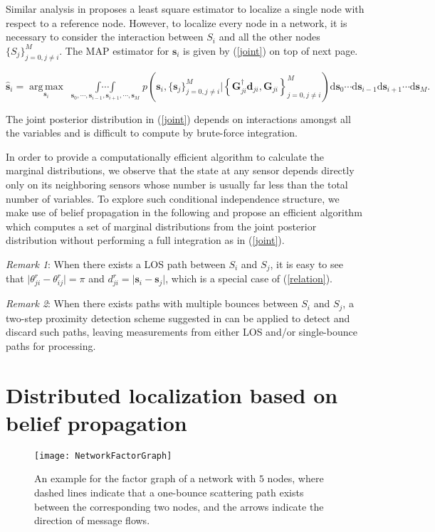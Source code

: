 \documentclass[10pt, twocolumn, final]{IEEEtran}
\begin{document}
Similar analysis in \cite{Seow2008} proposes a least square estimator to localize a single node with respect to a reference node. However, to localize every node in a network, it is necessary to consider the interaction between $S_i$ and all the other nodes $\{S_j\}_{j = 0, j \neq i}^{M}$. The MAP estimator for $\mathbf{s}_i$ is given by (\ref{joint}) on top of next page.
\begin{figure*}[!t]
\setcounter{equation}{6}
\begin{equation}\label{joint}
\hat{\mathbf{s}}_i = \operatorname*{arg\,max}_{\mathbf{s}_i} \ \operatorname*{\int\cdots\int}_{\mathbf{s}_0, \cdots, \mathbf{s}_{i-1}, \mathbf{s}_{i+1}, \cdots, \mathbf{s}_{M}} p\left(\mathbf{s}_i, \{\mathbf{s}_j\}_{j=0, j \neq i}^{M} \bigg\vert \left\{\mathbf{G}_{ji}^{\dagger}\mathbf{d}_{ji}, \mathbf{G}_{ji}\right\}_{j = 0, j \neq i}^{M}\right) \mathrm{d} \mathbf{s}_0 \cdots \mathrm{d} \mathbf{s}_{i-1} \mathrm{d} \mathbf{s}_{i+1} \cdots \mathrm{d} \mathbf{s}_M.
\end{equation}
\hrulefill
\end{figure*}
The joint posterior distribution in (\ref{joint}) depends on interactions amongst all the variables and is difficult to compute by brute-force integration.

In order to provide a computationally efficient algorithm to calculate the marginal distributions, we observe that the state at any sensor depends directly only on its neighboring sensors whose number is usually far less than the total number of variables. To explore such conditional independence structure, we make use of belief propagation in the following and propose an efficient algorithm which computes a set of marginal distributions from the joint posterior distribution without performing a full integration as in (\ref{joint}).

\emph{Remark 1}: When there exists a LOS path between $S_i$ and $S_j$, it is easy to see that $\vert \theta_{ji}^r - \theta_{ij}^r \vert  = \pi$ and $d_{ji}^{r} = \vert \mathbf{s}_i - \mathbf{s}_j \vert$, which is a special case of (\ref{relation}).

\emph{Remark 2}: When there exists paths with multiple bounces between $S_i$ and $S_j$, a two-step proximity detection scheme suggested in \cite{Seow2008} can be applied to detect and discard such paths, leaving measurements from either LOS and/or single-bounce paths for processing.

\section{Distributed localization based on belief propagation}\label{Section:DistributedLocalization}
\begin{figure}[!t]
\centering
\texttt{[image: NetworkFactorGraph]}
\caption{An example for the factor graph of a network with $5$ nodes, where dashed lines indicate that a one-bounce scattering path exists between the corresponding two nodes, and the arrows indicate the direction of message flows.} \label{Figure-FG}
\end{figure}
\end{document}
